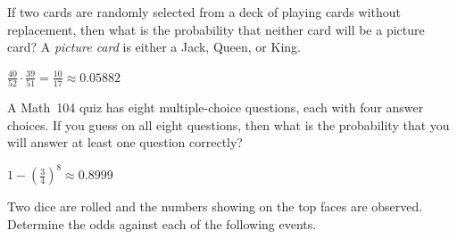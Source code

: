 \documentclass[addpoints,12pt]{exam}
\begin{document}
\begin{questions}
\begin{solution}
\end{solution}
\newpage

\question[10] If two cards are randomly selected from a deck
of playing cards without replacement,
then what is the probability that neither card
will be a picture card? A {\em picture card} is either a Jack, Queen, or King.
\begin{solution}
$\frac{40}{52}\cdot\frac{39}{51}=\frac{10}{17}\approx 0.05882$
\end{solution}
\vspace{2in}

\question[12] A Math~104 quiz has eight multiple-choice
questions, each with four answer choices. If you guess on all
eight questions, then what is the probability that you will answer at
least one question correctly?
\begin{solution}
$1-\left(\frac{3}{4}\right)^8\approx 0.8999$
\end{solution}
\vspace{2in}

\question[16] Two dice are rolled and the
numbers showing on the top faces are observed.
Determine the odds against each of the following events.
\begin{solution}
\begin{parts}

\end{parts}
\end{solution}
\end{questions}
\end{document}
